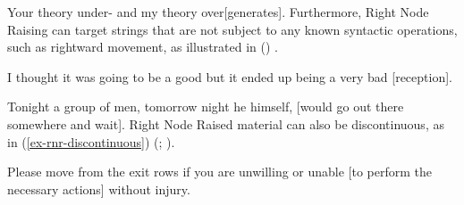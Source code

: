 \ex Your theory under- and my theory over[generates].\label{57}\zl
%
Furthermore, Right Node Raising can target strings that are not subject to any known syntactic operations, such as rightward movement, as illustrated in () \citep[865]{Chaves2014}.

\ealnoraggedright
\ex I thought it was going to be a good but it ended up being a very bad [reception].\label{58}

\ex Tonight a group of men, tomorrow night he himself, [would go out there somewhere and wait].\label{59}
\zl
Right Node Raised material can also be discontinuous, as in (\ref{ex-rnr-discontinuous}) (\citealt[868]{Chaves2014}; \citealt[238--240]{Whitman2009}).

\ealnoraggedright
\label{ex-rnr-discontinuous}
\ex Please move from the exit rows if you are unwilling or unable [to perform the necessary actions] without injury.\label{61}

